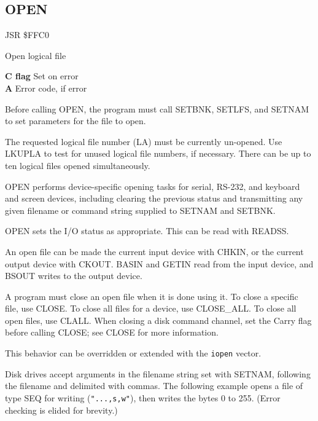 
\newpage
\subsection{OPEN}
\label{KERNAL Jump Table!OPEN}
\begin{description}[leftmargin=2cm,style=nextline]
    \item [Address:] JSR \$FFC0
    \item [Description:] Open logical file
    \item [Outputs:]
        \textbf{C flag} Set on error \\
        \textbf{A} Error code, if error
    \item [Remarks:]
        Before calling OPEN, the program must call SETBNK, SETLFS, and SETNAM to set parameters for the file to open.

        The requested logical file number (LA) must be currently un-opened. Use LKUPLA to test for unused logical file numbers, if necessary. There can be up to ten logical files opened simultaneously.

        OPEN performs device-specific opening tasks for serial, RS-232, and keyboard and screen devices, including clearing the previous status and transmitting any given filename or command string supplied to SETNAM and SETBNK.

        OPEN sets the I/O status as appropriate. This can be read with READSS.

        An open file can be made the current input device with CHKIN, or the current output device with CKOUT. BASIN and GETIN read from the input device, and BSOUT writes to the output device.

        A program must close an open file when it is done using it. To close a specific file, use CLOSE. To close all files for a device, use CLOSE\_ALL. To close all open files, use CLALL. When closing a disk command channel, set the Carry flag before calling CLOSE; see CLOSE for more information.

        This behavior can be overridden or extended with the \texttt{iopen} vector.
    \item [Examples:]
        Disk drives accept arguments in the filename string set with SETNAM, following the filename and delimited with commas. The following example opens a file of type SEQ for writing (\texttt{"...,s,w"}), then writes the bytes 0 to 255. (Error checking is elided for brevity.)


\end{description}
